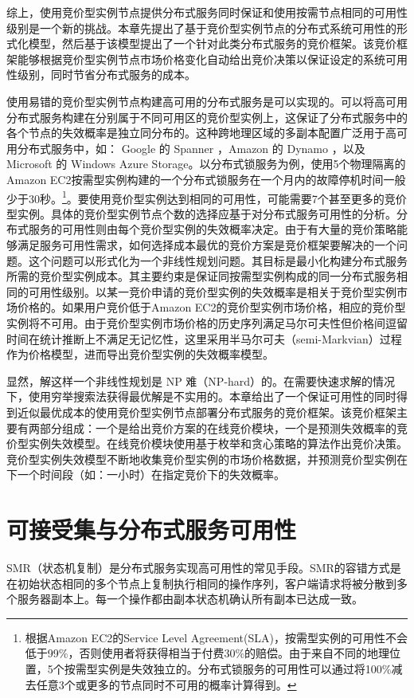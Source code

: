 综上，使用竞价型实例节点提供分布式服务同时保证和使用按需节点相同的可用性级别是一个新的挑战。本章先提出了基于竞价型实例节点的分布式系统可用性的形式化模型，然后基于该模型提出了一个针对此类分布式服务的竞价框架。该竞价框架能够根据竞价型实例节点市场价格变化自动给出竞价决策以保证设定的系统可用性级别，同时节省分布式服务的成本。

使用易错的竞价型实例节点构建高可用的分布式服务是可以实现的。可以将高可用分布式服务构建在分别属于不同可用区的竞价型实例上，这保证了分布式服务中的各个节点的失效概率是独立同分布的。这种跨地理区域的多副本配置广泛用于高可用分布式服务中，如： Google 的 Spanner \cite{Corbett:2012:SGG:2387880.2387905}，Amazon 的 Dynamo \cite{DeCandia:2007:DAH:1294261.1294281}，以及Microsoft 的 Windows Azure Storage\cite{Calder:2011:WAS:2043556.2043571}。以分布式锁服务为例，使用5个物理隔离的Amazon EC2按需型实例构建的一个分布式锁服务在一个月内的故障停机时间一般少于30秒。\footnote{根据Amazon EC2的Service Level Agreement(SLA)，按需型实例的可用性不会低于99\%，否则使用者将获得相当于付费30\%的赔偿。由于来自不同的地理位置，5个按需型实例是失效独立的。分布式锁服务的可用性可以通过将100\%减去任意3个或更多的节点同时不可用的概率计算得到。}。要使用竞价型实例达到相同的可用性，可能需要7个甚至更多的竞价型实例。具体的竞价型实例节点个数的选择应基于对分布式服务可用性的分析。分布式服务的可用性则由每个竞价型实例的失效概率决定。由于有大量的竞价策略能够满足服务可用性需求，如何选择成本最优的竞价方案是竞价框架要解决的一个问题。这个问题可以形式化为一个非线性规划问题。其目标是最小化构建分布式服务所需的竞价型实例成本。其主要约束是保证同按需型实例构成的同一分布式服务相同的可用性级别。以某一竞价申请的竞价型实例的失效概率是相关于竞价型实例市场价格的。如果用户竞价低于Amazon EC2的竞价型实例市场价格，相应的竞价型实例将不可用。由于竞价型实例市场价格的历史序列满足马尔可夫性但价格间逗留时间在统计推断上不满足无记忆性，这里采用半马尔可夫（semi-Markvian）过程作为价格模型，进而导出竞价型实例的失效概率模型。

显然，解这样一个非线性规划是 NP 难（NP-hard）的。在需要快速求解的情况下，使用穷举搜索法获得最优解是不实用的。本章给出了一个保证可用性的同时得到近似最优成本的使用竞价型实例节点部署分布式服务的竞价框架。该竞价框架主要有两部分组成：一个是给出竞价方案的在线竞价模块，一个是预测失效概率的竞价型实例失效模型。在线竞价模块使用基于枚举和贪心策略的算法作出竞价决策。竞价型实例失效模型不断地收集竞价型实例的市场价格数据，并预测竞价型实例在下一个时间段（如：一小时）在指定竞价下的失效概率。

\section{可接受集与分布式服务可用性}
\label{sec:jupiter_dist_basis}
SMR（状态机复制）是分布式服务实现高可用性的常见手段。SMR的容错方式是在初始状态相同的多个节点上复制执行相同的操作序列，客户端请求将被分散到多个服务器副本上。每一个操作都由副本状态机确认所有副本已达成一致。

